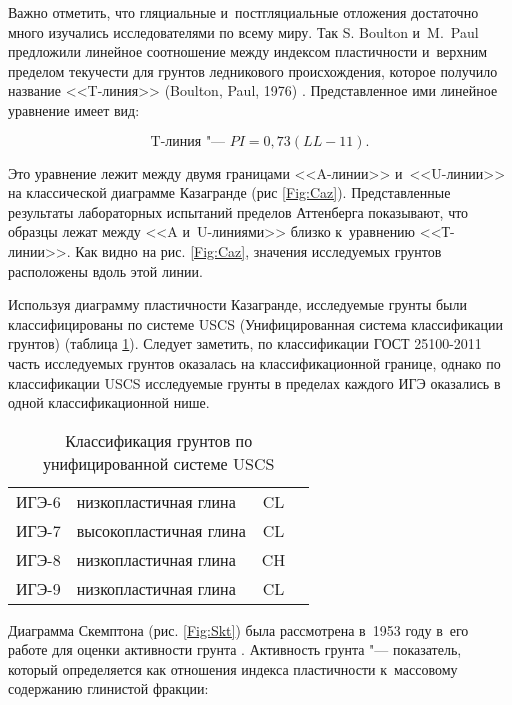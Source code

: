 Важно отметить, что гляциальные и~постгляциальные отложения достаточно много изучались исследователями по всему миру. Так S. Boulton и~M.~Paul  предложили линейное соотношение между  индексом пластичности и~верхним пределом текучести  для грунтов ледникового происхождения, которое получило название <<T-линия>> (Boulton, Paul, 1976) \cite{boulton1976}. Представленное ими линейное уравнение имеет вид:

\begin{equation}
    \label{eq:t}
    \text{T-линия "--- } PI = 0,73 (LL-11).
\end{equation}

Это уравнение лежит между двумя границами <<A-линии>> и~<<U-линии>> на классической диаграмме Казагранде (рис \ref{Fig:Caz}). Представленные результаты лабораторных испытаний пределов Аттенберга показывают, что образцы лежат между <<A и~U-линиями>> близко к~уравнению <<Т-линии>>. 
Как видно на рис. \ref{Fig:Caz}, значения исследуемых грунтов расположены вдоль этой линии. 

Используя диаграмму пластичности Казагранде, исследуемые грунты были классифицированы по системе USCS (Унифицированная система классификации грунтов) (таблица \ref{tab:uscs}). 
Следует заметить, по классификации ГОСТ 25100-2011 \cite{gost25100} часть исследуемых грунтов оказалась на классификационной границе, однако по классификации USCS исследуемые грунты в пределах каждого ИГЭ оказались в одной классификационной нише.

\begin{table}[ht]
    \centering
    \caption{Классификация грунтов по унифицированной системе USCS} \label{tab:uscs}
    \begin{tabular}{clcc}
    ИГЭ-6 \dotfill &  низкопластичная глина & CL \\
    ИГЭ-7 \dotfill &  высокопластичная глина  & CL \\
    ИГЭ-8 \dotfill &  низкопластичная глина & CH \\
    ИГЭ-9 \dotfill &  низкопластичная глина  & CL \\
    \end{tabular}
\end{table}

Диаграмма Скемптона (рис. \ref{Fig:Skt}) была рассмотрена в~1953 году в~его работе для оценки активности грунта \cite{skempton1953}.
Активность грунта "--- показатель, который определяется как отношения индекса пластичности к~массовому содержанию глинистой фракции:

